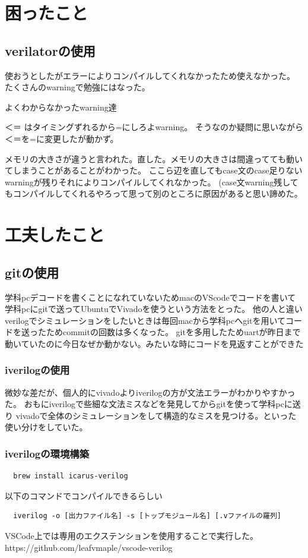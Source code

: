 \documentclass[a4paper,11pt]{jsarticle}
\begin{document}
\section{困ったこと}
\subsection{verilatorの使用}
使おうとしたがエラーによりコンパイルしてくれなかったため使えなかった。
たくさんのwarningで勉強にはなった。

よくわからなかったwarning達

＜＝ はタイミングずれるから=にしろよwarning。
そうなのか疑問に思いながら＜＝を=に変更したが動かず。


メモリの大きさが違うと言われた。直した。メモリの大きさは間違ってても動いてしまうことがあることがわかった。
ここら辺を直してもcase文のcase足りないwarningが残りそれによりコンパイルしてくれなかった。
(case文warning残してもコンパイルしてくれるやろって思って別のところに原因があると思い諦めた。

\section{工夫したこと}
\subsection{gitの使用}
学科pcデコードを書くことになれていないためmacのVScodeでコードを書いて学科pcにgitで送ってUbuntuでVivadoを使うという方法をとった。
他の人と違いverilogでシミュレーションをしたいときは毎回macから学科pcへgitを用いてコードを送ったためcommitの回数は多くなった。
gitを多用したためuartが昨日まで動いていたのに今日なぜか動かない。みたいな時にコードを見返すことができた




\subsubsection{iverilogの使用}
微妙な差だが、個人的にvivadoよりiverilogの方が文法エラーがわかりやすかった。
おもにiverilogで些細な文法ミスなどを発見してからgitを使って学科pcに送り
vivadoで全体のシミュレーションをして構造的なミスを見つける。といった使い分けをしていた。
\subsubsection{iverilogの環境構築}

\begin{lstlisting}
  brew install icarus-verilog\end{lstlisting}
以下のコマンドでコンパイルできるらしい
\begin{lstlisting}
  iverilog -o [出力ファイル名] -s [トップモジュール名] [.vファイルの羅列]\end{lstlisting}
VSCode上では専用のエクステンションを使用することで実行した。
  https://github.com/leafvmaple/vscode-verilog
\end{document}
